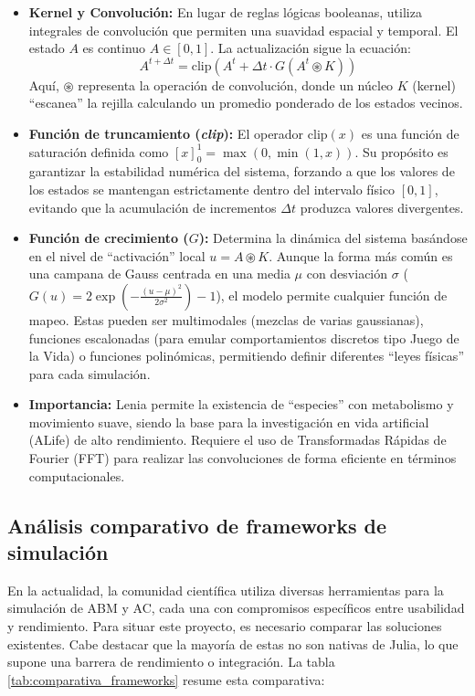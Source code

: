 \documentclass[runningheads]{llncs}
\begin{document}
\begin{itemize}
    \item \textbf{Kernel y Convolución:} En lugar de reglas lógicas booleanas, utiliza integrales de convolución que permiten una suavidad espacial y temporal. El estado $A$ es continuo $A \in [0, 1]$. La actualización sigue la ecuación:
    \begin{equation}A^{t+\Delta t} = \text{clip}\left( A^t + \Delta t \cdot G(A^t \circledast K) \right)\end{equation}
    Aquí, $\circledast$ representa la operación de convolución, donde un núcleo $K$ (kernel) ``escanea'' la rejilla calculando un promedio ponderado de los estados vecinos.
    
    \item \textbf{Función de truncamiento (\textit{clip}):} El operador $\text{clip}(x)$ es una función de saturación definida como $[x]_0^1 = \max(0, \min(1, x))$. Su propósito es garantizar la estabilidad numérica del sistema, forzando a que los valores de los estados se mantengan estrictamente dentro del intervalo físico $[0, 1]$, evitando que la acumulación de incrementos $\Delta t$ produzca valores divergentes.

    \item \textbf{Función de crecimiento ($G$):} Determina la dinámica del sistema basándose en el nivel de ``activación'' local $u = A \circledast K$. Aunque la forma más común es una campana de Gauss centrada en una media $\mu$ con desviación $\sigma$ ($G(u) = 2 \exp(- \frac{(u-\mu)^2}{2\sigma^2}) - 1$), el modelo permite cualquier función de mapeo. Estas pueden ser multimodales (mezclas de varias gaussianas), funciones escalonadas (para emular comportamientos discretos tipo Juego de la Vida) o funciones polinómicas, permitiendo definir diferentes ``leyes físicas'' para cada simulación.
    
    \item \textbf{Importancia:} Lenia permite la existencia de ``especies'' con metabolismo y movimiento suave, siendo la base para la investigación en vida artificial (ALife) de alto rendimiento. Requiere el uso de Transformadas Rápidas de Fourier (FFT) para realizar las convoluciones de forma eficiente en términos computacionales.
\end{itemize}


\subsection{Análisis comparativo de frameworks de simulación}
En la actualidad, la comunidad científica utiliza diversas herramientas para la simulación de ABM y AC, cada una con compromisos específicos entre usabilidad y rendimiento. Para situar este proyecto, es necesario comparar las soluciones existentes. Cabe destacar que la mayoría de estas no son nativas de Julia, lo que supone una barrera de rendimiento o integración. La tabla \ref{tab:comparativa_frameworks} resume esta comparativa:
\end{document}
